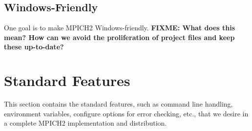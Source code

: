 \documentclass{article}
\def\fixme#1{\marginpar{FIXME:}\textbf{FIXME: #1}}
\begin{document}




\subsection{Windows-Friendly}

One goal is to make MPICH2 Windows-friendly.  
\fixme{What does this mean?  How can we avoid the proliferation of
  project files and keep these up-to-date?}





\section{Standard Features}
\label{sec:standard-features}
This section contains the standard features, such as command line
handling, environment variables, configure options for error checking,
etc., that we desire in a complete MPICH2 implementation and distribution.
\end{document}
